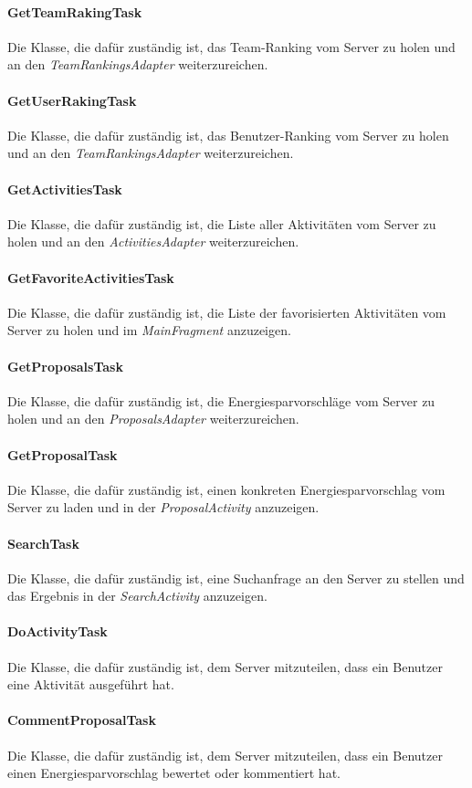 \paragraph{GetTeamRakingTask} Die Klasse, die dafür zuständig ist, das Team-Ranking vom Server zu holen und an den \emph{TeamRankingsAdapter} weiterzureichen.
\paragraph{GetUserRakingTask} Die Klasse, die dafür zuständig ist, das Benutzer-Ranking vom Server zu holen und an den \emph{TeamRankingsAdapter} weiterzureichen.
\paragraph{GetActivitiesTask} Die Klasse, die dafür zuständig ist, die Liste aller Aktivitäten vom Server zu holen und an den \emph{ActivitiesAdapter} weiterzureichen.
\paragraph{GetFavoriteActivitiesTask} Die Klasse, die dafür zuständig ist, die Liste der favorisierten Aktivitäten vom Server zu holen und im \emph{MainFragment} anzuzeigen.
\paragraph{GetProposalsTask} Die Klasse, die dafür zuständig ist, die Energiesparvorschläge vom Server zu holen und an den \emph{ProposalsAdapter} weiterzureichen.
\paragraph{GetProposalTask} Die Klasse, die dafür zuständig ist, einen konkreten Energiesparvorschlag vom Server zu laden und in der \emph{ProposalActivity} anzuzeigen.
\paragraph{SearchTask} Die Klasse, die dafür zuständig ist, eine Suchanfrage an den Server zu stellen und das Ergebnis in der \emph{SearchActivity} anzuzeigen.
\paragraph{DoActivityTask} Die Klasse, die dafür zuständig ist, dem Server mitzuteilen, dass ein Benutzer eine Aktivität ausgeführt hat.
\paragraph{CommentProposalTask} Die Klasse, die dafür zuständig ist, dem Server mitzuteilen, dass ein Benutzer einen Energiesparvorschlag bewertet oder kommentiert hat.

